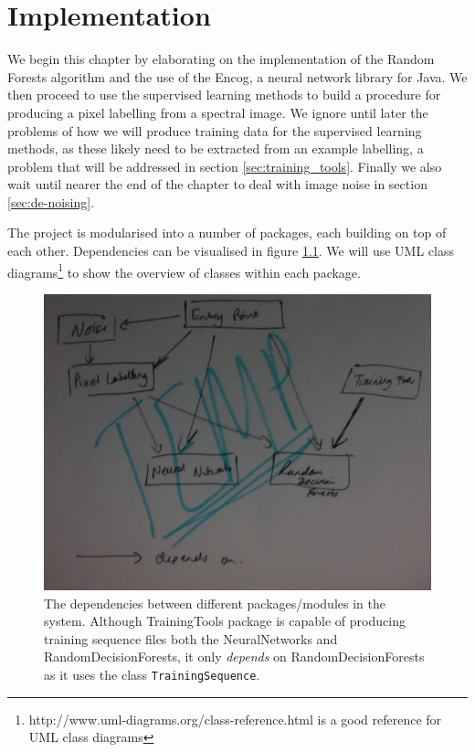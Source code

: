 \documentclass[12pt,twoside,notitlepage]{report}
\begin{document}
\chapter{Implementation}
    We begin this chapter by elaborating on the implementation of the Random Forests algorithm and the use of the Encog, a 
    neural network library for Java. We then proceed to use the supervised learning methods to build a procedure for 
    producing a pixel labelling from a spectral image. We ignore until later the problems of how we will produce 
    training data for the supervised learning methods, as these likely need to be extracted from an example labelling, 
    a problem that will be addressed in section \ref{sec:training_tools}. Finally we also wait until nearer the end of 
    the chapter to deal with image noise in section \ref{sec:de-noising}.

    The project is modularised into a number of packages, each building on top of each other. Dependencies can be 
    visualised in figure \ref{fig:package_dependencies}. We will use UML class diagrams\footnote{http://www.uml-diagrams.org/class-reference.html is a good reference for UML class diagrams} to show the 
    overview of classes within each package.

    \begin{figure}[H]
        \centering
        \includegraphics[scale=0.5]{package_dependencies.jpeg}
        \caption{The dependencies between different packages/modules in the system. Although TrainingTools package is
        capable of producing training sequence files both the NeuralNetworks and RandomDecisionForests, it only 
        \textit{depends} on RandomDecisionForests as it uses the class \texttt{TrainingSequence}.}
        \label{fig:package_dependencies}
    \end{figure}
\end{document}
